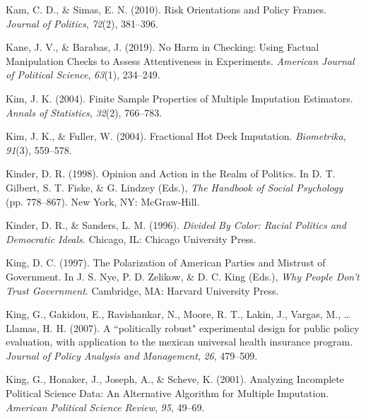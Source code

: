 \documentclass[12pt,econ]{sources/authesis}
\newenvironment{CSLReferences}%
  {}%
  {\par}
\begin{document}
\begin{CSLReferences}{1}{0}
\leavevmode{}%
Kam, C. D., \& Simas, E. N. (2010). Risk {Orientations} and {Policy} {Frames}. \emph{Journal of Politics}, \emph{72}(2), 381--396.

\leavevmode{}%
Kane, J. V., \& Barabas, J. (2019). {No Harm in Checking: Using Factual Manipulation Checks to Assess Attentiveness in Experiments}. \emph{American Journal of Political Science}, \emph{63}(1), 234--249.

\leavevmode{}%
Kim, J. K. (2004). {Finite Sample Properties of Multiple Imputation Estimators}. \emph{Annals of Statistics}, \emph{32}(2), 766--783.

\leavevmode{}%
Kim, J. K., \& Fuller, W. (2004). {Fractional Hot Deck Imputation}. \emph{Biometrika}, \emph{91}(3), 559--578.

\leavevmode{}%
Kinder, D. R. (1998). {Opinion and Action in the Realm of Politics}. In D. T. Gilbert, S. T. Fiske, \& G. Lindzey (Eds.), \emph{{The Handbook of Social Psychology}} (pp. 778--867). New York, NY: McGraw-Hill.

\leavevmode{}%
Kinder, D. R., \& Sanders, L. M. (1996). \emph{{Divided By Color: Racial Politics and Democratic Ideals}}. Chicago, IL: Chicago University Press.

\leavevmode{}%
King, D. C. (1997). The {Polarization} of {American} {Parties} and {Mistrust} of {Government}. In J. S. Nye, P. D. Zelikow, \& D. C. King (Eds.), \emph{Why {People} {Don}'t {Trust} {Government}}. Cambridge, MA: Harvard University Press.

\leavevmode{}%
King, G., Gakidou, E., Ravishankar, N., Moore, R. T., Lakin, J., Vargas, M., \ldots{} Llamas, H. H. (2007). A ``politically robust" experimental design for public policy evaluation, with application to the mexican universal health insurance program. \emph{Journal of Policy Analysis and Management}, \emph{26}, 479--509.

\leavevmode{}%
King, G., Honaker, J., Joseph, A., \& Scheve, K. (2001). {Analyzing Incomplete Political Science Data: An Alternative Algorithm for Multiple Imputation}. \emph{American Political Science Review}, \emph{95}, 49--69.


\end{CSLReferences}
\end{document}
